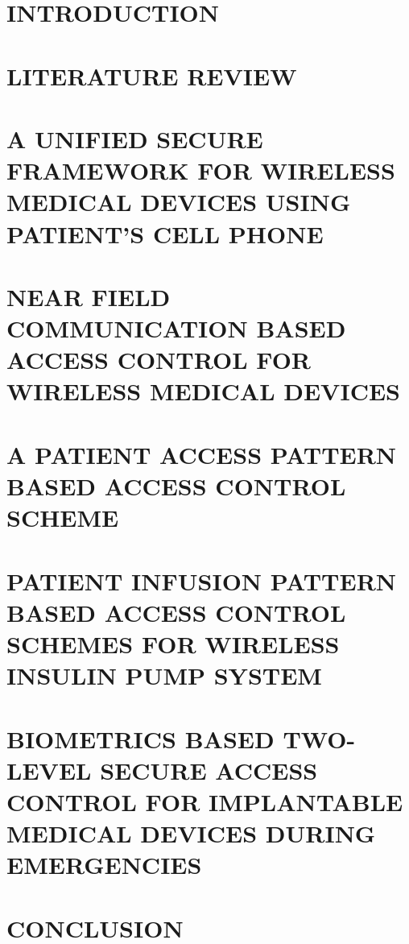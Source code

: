 \documentclass[reqno,12pt,oneside]{report} %
\theoremstyle{plain}
\theoremstyle{definition}
\theoremstyle{remark}
\numberwithin{theorem}{chapter}
\begin{document}
\chapter{INTRODUCTION}
 \label{chap:1}
 

\chapter{LITERATURE REVIEW}
 \label{chap:2}
 

\chapter{A UNIFIED SECURE FRAMEWORK FOR WIRELESS MEDICAL DEVICES USING PATIENT'S CELL PHONE}
 \label{chap:3}
 

\chapter{NEAR FIELD COMMUNICATION BASED ACCESS CONTROL FOR WIRELESS MEDICAL DEVICES}
 \label{chap:4}
 

\chapter{A PATIENT ACCESS PATTERN BASED ACCESS CONTROL SCHEME}
 \label{chap:5}
 

\chapter{PATIENT INFUSION PATTERN BASED ACCESS CONTROL SCHEMES FOR WIRELESS INSULIN PUMP SYSTEM}
 \label{chap:6}
 

\chapter{BIOMETRICS BASED TWO-LEVEL SECURE ACCESS CONTROL FOR IMPLANTABLE MEDICAL DEVICES DURING EMERGENCIES}
 \label{chap:7}
 

\chapter{CONCLUSION}
 \label{chap:8}
 


\startbibliography
 \begin{singlespace} %
  
  
 \end{singlespace}

 \startappendices
 \label{Carelink USB Driver Decoding}
 
\end{document}
